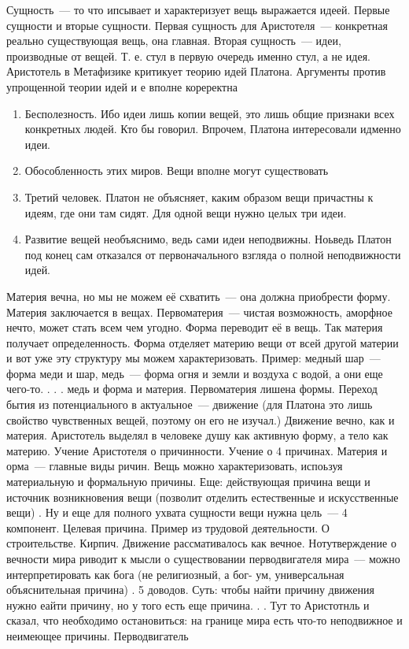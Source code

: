 Сущность~--- то что ипсывает и характеризует вещь выражается идеей. Первые сущности и вторые сущности. Первая сущность для Аристотеля~--- конкретная реально существующая вещь, она главная. Вторая сущность~--- идеи, производные от вещей. Т. е. стул в первую очередь именно стул, а не идея. Аристотель в Метафизике критикует теорию идей Платона. Аргументы против упрощенной теории идей и е вполне кореректна

\begin{enumerate}
	\item Бесполезность. Ибо идеи лишь копии вещей, это лишь общие признаки всех конкретных людей. Кто бы говорил. Впрочем, Платона интересовали идменно идеи. 
	\item Обособленность этих миров. Вещи вполне могут существовать
	\item Третий человек. Платон не объясняет, каким образом вещи причастны к идеям, где они там сидят. Для одной вещи нужно целых три идеи. 
	\item Развитие вещей необъяснимо, ведь сами идеи неподвижны. Ноьведь Платон под конец сам отказался от первоначального взгляда о полной неподвижности идей. 
\end{enumerate}

Материя вечна, но мы не можем её схватить~--- она должна приобрести форму. Материя заключается в вещах. Первоматерия~--- чистая возможность, аморфное нечто, может стать всем чем угодно. Форма переводит её в вещь. Так материя получает определенность. Форма отделяет материю вещи от всей другой материи и вот уже эту структуру мы можем характеризовать. Пример: медный шар~--- форма меди и шар, медь~--- форма огня и земли и воздуха с водой, а они еще чего-то. . . . медь и форма и материя. Первоматерия лишена формы. Переход бытия из потенциального в актуальное~--- движение (для Платона это лишь свойство чувственных вещей, поэтому он его не изучал.) Движение вечно, как и материя. 
Аристотель выделял в человеке душу как активную форму, а тело как материю. 
Учение Аристотеля о причинности. Учение о 4 причинах. Материя и орма~--- главные виды ричин. Вещь можно характеризовать, испоьзуя материальную и формальную причины. Еще: действующая причина вещи и источник возникновения вещи (позволит отделить естественные и искусственные вещи) . Ну и еще для полного ухвата сущности вещи нужна цель~--- 4 компонент. Целевая причина. 
Пример из трудовой деятельности. О строительстве. Кирпич. 
Движение рассмативалось как вечное. Нотутверждение о вечности мира риводит к мысли о существовании перводвигателя мира~--- можно интерпретировать как бога (не религиозный, а бог- ум, универсальная объяснительная причина) . 5 доводов. Суть: чтобы найти причину движения нужно еайти причину, но у того есть еще причина. . . Тут то Аристотнль и сказал, что необходимо остановиться: на границе мира есть что-то неподвижное и неимеющее причины. 
Перводвигатель

